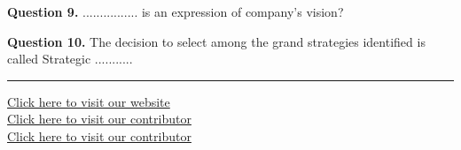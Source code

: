 \documentclass[11pt,a4paper]{article}
\begin{document}
\medskip\noindent\textbf{Question 9.} ................ is an expression of company's vision?

\medskip\noindent\textbf{Question 10.} The decision to select among the grand strategies identified is called Strategic ...........

\vfill
\rule{\linewidth}{0.4pt}
\begin{center}\small
\href{https://bhu-exam.vercel.app/}{Click here to visit our website}\\[4pt]\href{https://me-aryan.vercel.app/}{Click here to visit our contributor}\\[4pt]\href{https://quashan-me.vercel.app/}{Click here to visit our contributor}
\end{center}
\end{document}
